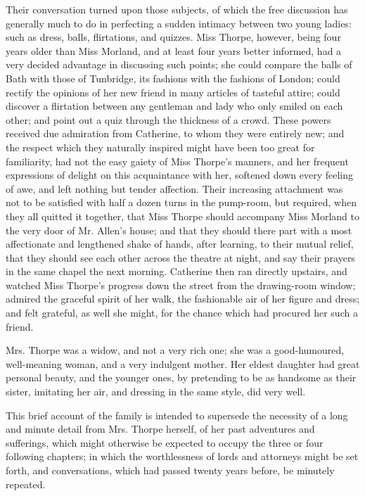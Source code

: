 Their conversation turned upon those subjects, of which the free discussion has generally much to do in perfecting a sudden intimacy between two young ladies: such as dress, balls, flirtations, and quizzes. Miss Thorpe, however, being four years older than Miss Morland, and at least four years better informed, had a very decided advantage in discussing such points; she could compare the balls of Bath with those of Tunbridge, its fashions with the fashions of London; could rectify the opinions of her new friend in many articles of tasteful attire; could discover a flirtation between any gentleman and lady who only smiled on each other; and point out a quiz through the thickness of a crowd. These powers received due admiration from Catherine, to whom they were entirely new; and the respect which they naturally inspired might have been too great for familiarity, had not the easy gaiety of Miss Thorpe's manners, and her frequent expressions of delight on this acquaintance with her, softened down every feeling of awe, and left nothing but tender affection. Their increasing attachment was not to be satisfied with half a dozen turns in the pump-room, but required, when they all quitted it together, that Miss Thorpe should accompany Miss Morland to the very door of Mr. Allen's house; and that they should there part with a most affectionate and lengthened shake of hands, after learning, to their mutual relief, that they should see each other across the theatre at night, and say their prayers in the same chapel the next morning. Catherine then ran directly upstairs, and watched Miss Thorpe's progress down the street from the drawing-room window; admired the graceful spirit of her walk, the fashionable air of her figure and dress; and felt grateful, as well she might, for the chance which had procured her such a friend.

Mrs. Thorpe was a widow, and not a very rich one; she was a good-humoured, well-meaning woman, and a very indulgent mother. Her eldest daughter had great personal beauty, and the younger ones, by pretending to be as handsome as their sister, imitating her air, and dressing in the same style, did very well.

This brief account of the family is intended to supersede the necessity of a long and minute detail from Mrs. Thorpe herself, of her past adventures and sufferings, which might otherwise be expected to occupy the three or four following chapters; in which the worthlessness of lords and attorneys might be set forth, and conversations, which had passed twenty years before, be minutely repeated.

